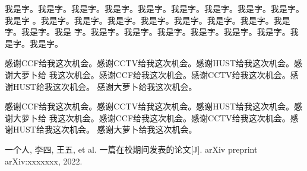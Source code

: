 \documentclass[supercite]{HustGraduPaper}
\theoremstyle{definition}
\begin{document}
我是字。我是字。我是字。我是字。我是字。我是字。我是字。我是字。我是字。我是字
。我是字。我是字。我是字。我是字。我是字。我是字。我是字。我是字。我是字。我是
字。我是字。我是字。我是字。我是字。我是字。我是字。我是字。我是字。

\begin{thankpage}

感谢CCF给我这次机会。感谢CCTV给我这次机会。感谢HUST给我这次机会。感谢大萝卜给
我这次机会。感谢CCF给我这次机会。感谢CCTV给我这次机会。感谢HUST给我这次机会。
感谢大萝卜给我这次机会。

感谢CCF给我这次机会。感谢CCTV给我这次机会。感谢HUST给我这次机会。感谢大萝卜给
我这次机会。感谢CCF给我这次机会。感谢CCTV给我这次机会。感谢HUST给我这次机会。
感谢大萝卜给我这次机会。

\end{thankpage}

\nocite{*}





\begin{mypaper}
\begin{thebibliography}{99}  
一个人, 李四, 王五, et al. 一篇在校期间发表的论文[J]. arXiv preprint arXiv:xxxxxxx, 2022.
\end{thebibliography}
\end{mypaper}
\end{document}
